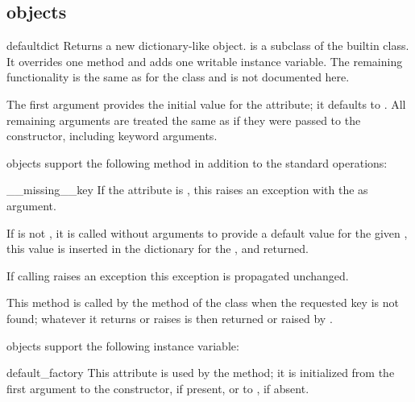 \subsection{ objects \label{defaultdict-objects}}

\begin{classdesc}{defaultdict}{}
  Returns a new dictionary-like object.   is a subclass
  of the builtin  class.  It overrides one method and adds one
  writable instance variable.  The remaining functionality is the same as
  for the  class and is not documented here.

  The first argument provides the initial value for the
   attribute; it defaults to .
  All remaining arguments are treated the same as if they were
  passed to the  constructor, including keyword arguments.

\end{classdesc}

 objects support the following method in addition to
the standard  operations:

\begin{methoddesc}{__missing__}{key}
  If the  attribute is , this raises
  an  exception with the  as argument.

  If  is not , it is called without
  arguments to provide a default value for the given , this
  value is inserted in the dictionary for the , and returned.

  If calling  raises an exception this exception
  is propagated unchanged.

  This method is called by the  method of the
   class when the requested key is not found; whatever it
  returns or raises is then returned or raised by .
\end{methoddesc}

 objects support the following instance variable:

\begin{memberdesc}{default_factory}
  This attribute is used by the  method; it is initialized
  from the first argument to the constructor, if present, or to , 
  if absent.
\end{memberdesc}



